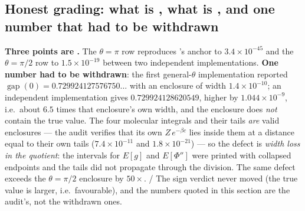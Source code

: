 
\subsection{Honest grading: what is \LT, what is \LC, and one number that had to be withdrawn}
\label{sec:grading}

\begin{gradebox}
\textbf{Three points are \LT.} The $\theta=\pi$ row reproduces 's anchor to
$3.4\times10^{-45}$ and the $\theta=\pi/2$ row to $1.5\times10^{-19}$ between two independent
implementations. \textbf{One number had to be withdrawn}: the first general-$\theta$
implementation reported $\operatorname{gap}(0)=0.729924127576750\ldots$ with an enclosure of
width $1.4\times10^{-10}$; an independent implementation gives $0.729924128620549$, higher by
$1.044\times10^{-9}$, i.e.\ about $6.5$ times that enclosure's own width, and the enclosure does
\emph{not} contain the true value. The four molecular integrals and their tails \emph{are} valid
enclosures --- the audit verifies that its own $Z\,e^{-\beta c}$ lies inside them at a distance
equal to their own tails ($7.4\times10^{-11}$ and $1.8\times10^{-21}$) --- so the defect is
\emph{width loss in the quotient}: the intervals for $E[g]$ and $E[\Phi'']$ were printed with
collapsed endpoints and the tails did not propagate through the division. The same defect exceeds
the $\theta=\pi/2$ enclosure by $50\times$. \LE{}/\LT{} The sign verdict never moved (the true value
is larger, i.e.\ favourable), and the numbers quoted in this section are the audit's, not the
withdrawn ones.
\end{gradebox}


